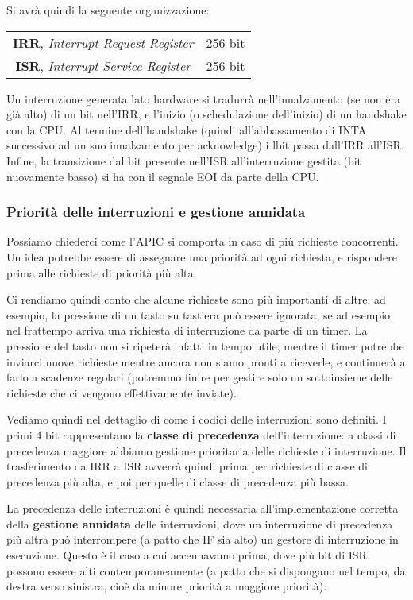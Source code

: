 \documentclass[a4paper,11pt]{article}
\begin{document}
Si avrà quindi la seguente organizzazione:
\begin{table}[h!]
	\center 
	\begin{tabular} { c | c  }
		\textbf{IRR}, \textit{Interrupt Request Register} & 256 bit \\
		\textbf{ISR}, \textit{Interrupt Service Register} & 256 bit
	\end{tabular}
\end{table}

Un interruzione generata lato hardware si tradurrà nell'innalzamento (se non era già alto) di un bit nell'IRR, e l'inizio (o schedulazione dell'inizio) di un handshake con la CPU.
Al termine dell'handshake (quindi all'abbassamento di INTA successivo ad un suo innalzamento per acknowledge) i lbit passa dall'IRR all'ISR.
Infine, la transizione dal bit presente nell'ISR all'interruzione gestita (bit nuovamente basso) si ha con il segnale EOI da parte della CPU.

\subsubsection{Priorità delle interruzioni e gestione annidata}
Possiamo chiederci come l'APIC si comporta in caso di più richieste concorrenti.
Un idea potrebbe essere di assegnare una priorità ad ogni richiesta, e rispondere prima alle richieste di priorità più alta.

Ci rendiamo quindi conto che alcune richieste sono più importanti di altre: ad esempio, la pressione di un tasto su tastiera può essere ignorata, se ad esempio nel frattempo arriva una richiesta di interruzione da parte di un timer.
La pressione del tasto non si ripeterà infatti in tempo utile, mentre il timer potrebbe inviarci nuove richieste mentre ancora non siamo pronti a riceverle, e continuerà a farlo a scadenze regolari (potremmo finire per gestire solo un sottoinsieme delle richieste che ci vengono effettivamente inviate).

Vediamo quindi nel dettaglio di come i codici delle interruzioni sono definiti.
I primi 4 bit rappresentano la \textbf{classe di precedenza} dell'interruzione: a classi di precedenza maggiore abbiamo gestione prioritaria delle richieste di interruzione.
Il trasferimento da IRR a ISR avverrà quindi prima per richieste di classe di precedenza più alta, e poi per quelle di classe di precedenza più bassa.

La precedenza delle interruzioni è quindi necessaria all'implementazione corretta della \textbf{gestione annidata} delle interruzioni, dove un interruzione di precedenza più altra può interrompere (a patto che IF sia alto) un gestore di interruzione in esecuzione. 
Questo è il caso a cui accennavamo prima, dove più bit di ISR possono essere alti contemporaneamente (a patto che si dispongano nel tempo, da destra verso sinistra, cioè da minore priorità a maggiore priorità).
\end{document}
